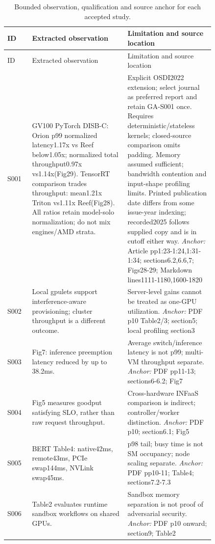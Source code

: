 \begin{longtable}{P{0.105\linewidth}P{0.39\linewidth}P{0.35\linewidth}}
\caption{Bounded observation, qualification and source anchor for each accepted study.}\\
\toprule ID & Extracted observation & Limitation and source location\\\midrule\endfirsthead
\toprule ID & Extracted observation & Limitation and source location\\\midrule\endhead
S001 \cite{reef} & GV100 PyTorch DISB-C: Orion p99 normalized latency1.17x vs Reef below1.05x; normalized total throughput0.97x vs1.14x(Fig29). TensorRT comparison trades throughput: mean1.21x Triton vs1.11x Reef(Fig28). All ratios retain model-solo normalization; do not mix engines/AMD strata. & Explicit OSDI2022 extension; select journal as preferred report and retain GA-S001 once. Requires deterministic/stateless kernels; closed-source comparison omits padding. Memory assumed sufficient; bandwidth contention and input-shape profiling limits. Printed publication date differs from some issue-year indexing; recorded2025 follows supplied copy and is in cutoff either way. \emph{Anchor:} Article pp1:23-1:24,1:31-1:34; sections6.2,6.6,7; Figs28-29; Markdown lines1111-1180,1600-1820 \\
S002 \cite{gpulet} & Local gpulets support interference-aware provisioning; cluster throughput is a different outcome. & Server-level gains cannot be treated as one-GPU utilization. \emph{Anchor:} PDF p10 Table2/3; section5; local profiling section3 \\
S003 \cite{pipeswitch} & Fig7: inference preemption latency reduced by up to 38.2ms. & Average switch/inference latency is not p99; multi-VM throughput separate. \emph{Anchor:} PDF pp11-13; sections6-6.2; Fig7 \\
S004 \cite{clockwork} & Fig5 measures goodput satisfying SLO, rather than raw request throughput. & Cross-hardware INFaaS comparison is indirect; controller/worker distinction. \emph{Anchor:} PDF p10; section6.1; Fig5 \\
S005 \cite{torpor} & BERT Table4: native42ms, remote43ms, PCIe swap144ms, NVLink swap45ms. & p98 tail; busy time is not SM occupancy; node scaling separate. \emph{Anchor:} PDF pp10-11; Table4; sections7.2-7.3 \\
S006 \cite{streambox} & Table2 evaluates runtime sandbox workflows on shared GPUs. & Sandbox memory separation is not proof of adversarial security. \emph{Anchor:} PDF p10 onward; section9; Table2 \\

\end{longtable}
